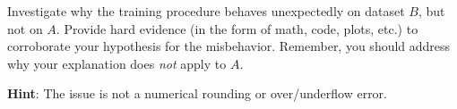 \item {}
Investigate why the training procedure behaves unexpectedly on dataset $B$, but
not on $A$. Provide hard evidence (in the form of math, code, plots, etc.) to
corroborate your hypothesis for the misbehavior. Remember, you should address
why your explanation does \emph{not} apply to $A$.

\textbf{Hint}: The issue is not a numerical rounding or over/underflow error.
